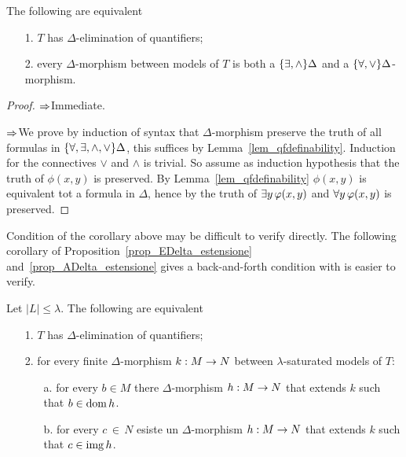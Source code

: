 \begin{corollary}\label{criterioeq1}
The following are equivalent
\begin{itemize}
\item[1.] $T$ has $\Delta$-elimination of quantifiers;
\item[2.] every $\Delta$-morphism between models of $T$ is both a $\{\exists,\wedge\}\Delta$ and a $\{\forall,\vee\}\Delta$-morphism.
\end{itemize}
\end{corollary}
\begin{proof}
$\Rightarrow$\quad Immediate.

$\Rightarrow$\quad We prove by induction of syntax that $\Delta$-morphism preserve the truth of all formulas in $\{\forall,\exists,\mathord\wedge,\mathord\vee\}\Delta$, this suffices by Lemma~\ref{lem_qfdefinability}. Induction for the connectives $\vee$ and $\wedge$ is trivial.  So assume as induction hypothesis that the truth of  $\phi(x,y)$ is preserved.  By Lemma~\ref{lem_qfdefinability} $\phi(x,y)$ is equivalent tot a formula in $\Delta$, hence by  the truth of $\exists y\, \varphi (x,y)$ and $\forall y \,\varphi (x,y)$ is preserved.
\end{proof}

Condition  of the corollary above may be difficult to verify directly. The following corollary of Proposition~\ref{prop_EDelta_estensione} and~\ref{prop_ADelta_estensione} gives a back-and-forth condition with is easier to verify.

\begin{corollary}\label{criterioeq2}
Let $|L|\le\lambda$. The following are equivalent
\begin{itemize}
\item[1.] $T$ has $\Delta$-elimination of quantifiers;
\item[2.] for every finite $\Delta$-morphism $k:M\rightarrow N$ between $\lambda$-saturated models of $T$:
\begin{itemize}                                                                                               \item[a.] for every $b\in M$ there $\Delta$-morphism $h:M\rightarrow N$ that extends $k$ such that $b\in\mathop{\rm dom} h$.                                                                                \item[b.] for every $c\,\in\,N$ esiste un $\Delta$-morphism $h:M\rightarrow N$ that extends $k$ such that $c\in\mathop{\rm img} h$.\QED                                                                                          \end{itemize}
\end{itemize}
\end{corollary}

